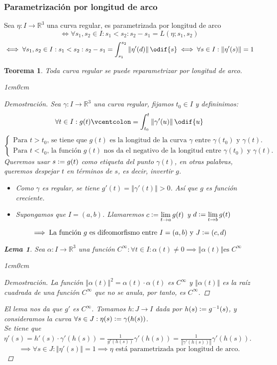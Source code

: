 \documentclass[12pt]{article}
\theoremstyle{plain}
\newtheorem{teo}{Teorema}[subsection]
\newtheorem{lem}{Lema}[subsection]
\newenvironment{dem}[1][]{%
  \begin{adjustwidth}{1cm}{0cm} \begin{proof}[Demostración\ifx\relax#1\relax\else{ (#1)}\fi]
}{\end{proof}\end{adjustwidth}}
\newcommand{\R}{\mathbb{R}}
\newcommand{\norm}[1]{\left\Vert#1\right\Vert}
\newcommand{\appl}[3]{#1 \colon #2 \longrightarrow #3}
\newcommand{\ds}{\displaystyle}
\newcommand{\tex}[1]{\text{#1}}
\newcommand{\defeq}{\vcentcolon=}
\renewcommand{\norm}[1]{\left\Vert#1\right\Vert}
\begin{document}
\subsubsection{Parametrización por longitud de arco}
\begin{defn}
    Sea $\appl{\eta}{I}{\R^3}$ una curva regular, es parametrizada por longitud de arco
    \[\iff \forall s_1, s_2 \in I : s_1<s_2 : s_2-s_1=L(\eta; s_1, s_2)\]
    \[\iff \forall s_1, s_2 \in I : s_1<s_2 : s_2-s_1=\int_{s_1}^{s_2}\norm{\eta'(d)}\odif{s} \iff \forall s \in I : \norm{\eta'(s)}=1\]
\end{defn}
\begin{teo}
    Toda curva regular se puede reparametrizar por longitud de arco.
    \begin{dem}
        Sea $\appl{\gamma}{I}{\R^3}$ una curva regular, fijamos $t_0\in I$ y defininimos: \[\forall t \in I : g(t)\defeq\int_{t_0}^t\norm{\gamma'(u)}\odif{u}\]
        \[\begin{cases}
            \tex{Para } t >t_0\tex{, se tiene que } g(t) \tex{ es la longitud de la curva } \gamma \tex{ entre } \gamma(t_0) \tex{ y } \gamma(t).\\
            \tex{Para } t <t_0\tex{, la función } g(t) \tex{ nos da el negativo de la longitud entre } \gamma(t_0) \tex{ y } \gamma(t).
        \end{cases}\]
        Queremos usar $s \defeq g(t)$ como etiqueta del punto $\gamma(t)$, en otras palabras, queremos despejar $t$ en términos de $s$, es decir, invertir $g$.
        \begin{itemize}
            \item Como $\gamma$ es regular, se tiene $g'(t)=\norm{\gamma'(t)}>0$. Así que $g$ es función creciente.
            \item Supongamos que $I=(a,b)$. Llamaremos $\ds c\defeq \lim_{t \rightarrow a}g(t)$ y $\ds d\defeq \lim_{t \rightarrow b}g(t)$ 
        \end{itemize}
        \[\implies \tex{La función $g$ es difeomorfismo entre $I=(a,b)$ y $J\defeq(c,d)$}\]
        \begin{lem}
            Sea $\appl{\alpha}{I}{\R^3}$ una función $C^\infty : \forall t\in I : \alpha(t)\ne 0 \implies \norm{\alpha(t)} \tex{es }C^\infty$
            \begin{dem}
                La función $\norm{\alpha(t)}^2=\alpha(t)\cdot\alpha(t)$ es $C^\infty$ y $\norm{\alpha(t)}$ es la raíz cuadrada de una función $C^\infty$ que no se anula, por tanto, es $C^\infty$.
            \end{dem}
        \end{lem}
        El lema nos da que $g'$ es $C^\infty$.
        Tomamos $\appl{h}{J}{I}$ dada por $h(s)\defeq g^{-1}(s)$, y consideramos la curva $\forall s \in J : \eta(s)\defeq\gamma(h(s))$. \\
        Se tiene que $\ds \eta'(s)=h'(s)\cdot\gamma'(h(s))=\frac{1}{g'(h(s))}\gamma'(h(s))=\frac{1}{\norm{\gamma'(h(s))}}\gamma'(h(s))$.
        \[\implies \forall s \in J : \norm{\eta'(s)}=1\implies \eta\tex{ está parametrizada por longitud de arco.}\]
    \end{dem}
\end{teo}
\end{document}
